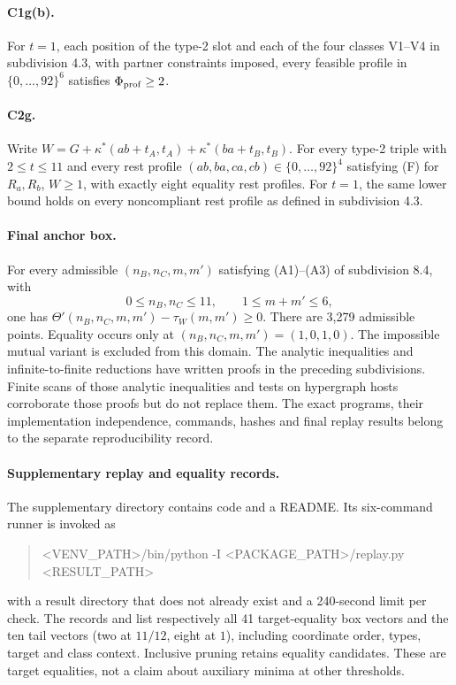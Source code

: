 \paragraph{C1g(b).} For $t=1$, each position of the type-2 slot and each of the four classes V1--V4 in subdivision 4.3, with partner constraints imposed, every feasible profile in $\{0,\ldots,92\}^6$ satisfies $\Phi_{\rm prof}\geq2$.
\paragraph{C2g.} Write $W=G+\kappa^*(ab+t_A,t_A)+\kappa^*(ba+t_B,t_B)$. For every type-2 triple with $2\leq t\leq11$ and every rest profile $(ab,ba,ca,cb)\in\{0,\ldots,92\}^4$ satisfying (F) for $R_a,R_b$, $W\geq1$, with exactly eight equality rest profiles. For $t=1$, the same lower bound holds on every noncompliant rest profile as defined in subdivision 4.3.
\paragraph{Final anchor box.} For every admissible $(n_B,n_C,m,m')$ satisfying (A1)--(A3) of subdivision 8.4, with
\[
 0\leq n_B,n_C\leq11,\qquad 1\leq m+m'\leq6,
\]
one has $\Theta'(n_B,n_C,m,m')-\tau_W(m,m')\geq0$.
There are 3,279 admissible points. Equality occurs only at $(n_B,n_C,m,m')=(1,0,1,0)$. The impossible mutual variant is excluded from this domain.
The analytic inequalities and infinite-to-finite reductions have written proofs in the preceding subdivisions. Finite scans of those analytic inequalities and tests on hypergraph hosts corroborate those proofs but do not replace them. The exact programs, their implementation independence, commands, hashes and final replay results belong to the separate reproducibility record.

\paragraph{Supplementary replay and equality records.}
The supplementary directory  contains code and a README. Its six-command runner is invoked as
\begin{quote}\ttfamily\small
<VENV\_PATH>/bin/python -I <PACKAGE\_PATH>/replay.py <RESULT\_PATH>
\end{quote}
with a result directory that does not already exist and a 240-second limit per check. The records  and  list respectively all 41 target-equality box vectors and the ten tail vectors (two at $11/12$, eight at $1$), including coordinate order, types, target and class context. Inclusive pruning retains equality candidates. These are target equalities, not a claim about auxiliary minima at other thresholds.

